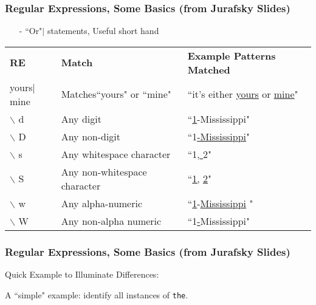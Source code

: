 \documentclass{beamer}
\numberwithin{equation}{section}
\begin{document}
\begin{frame}
\frametitle{Regular Expressions, Some Basics (from Jurafsky Slides) }

\begin{itemize}
\item[-] ``Or"$|$ statements, Useful short hand
\end{itemize}
\begin{center}
\begin{tabular}{lll}
\textbf{RE} & \textbf{Match} & \textbf{Example Patterns Matched}\\
yours$|$mine & Matches``yours" or ``mine" & ``it's either \underline{yours} or \underline{mine}"\\
$\backslash$ d  & Any digit  & ``\underline{1}-Mississippi" \\
$\backslash$ D  & Any non-digit & ``1\underline{-Mississippi}" \\
$\backslash$ s & Any whitespace character & ``1,\underline{ }2"\\
$\backslash$ S & Any non-whitespace character & ``\underline{1,} \underline{2}" \\
$\backslash$ w & Any alpha-numeric  &  ``\underline{1}-\underline{Mississippi} " \\
$\backslash$ W & Any non-alpha numeric & ``1\underline{-}Mississippi"  \\
\end{tabular}
\end{center}
\end{frame}



\begin{frame}
\frametitle{Regular Expressions, Some Basics (from Jurafsky Slides) }
Quick Example to Illuminate Differences:


A ``simple" example: identify all instances of \alert{{\tt the}}. \pause


\begin{itemize}
 \pause
{} \pause
{} \pause
{} \pause
{} \pause
{} \pause
{}
\end{itemize}

\end{frame}
\end{document}

